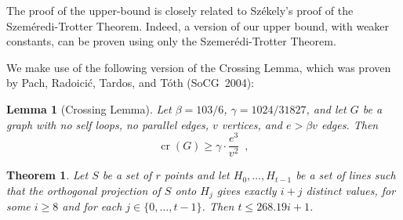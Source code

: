 \documentclass[12pt]{article}
\newtheorem{thm}{Theorem}
\newtheorem{lem}{Lemma}
\DeclareMathOperator{\cn}{cr}
\newcommand{\const}{268.19}
\begin{document}
The proof of the upper-bound is closely related to Sz\'ekely's proof of
the Szem\'eredi-Trotter Theorem.  Indeed, a version of our upper bound,
with weaker constants, can be proven using only the Szemer\'edi-Trotter
Theorem.

We make use of the following version of the Crossing Lemma, which was
proven by Pach, Radoici\'c, Tardos, and T\'oth (SoCG~2004):

\begin{lem}[Crossing Lemma]\label{lem:crossing}
Let
$\beta=103/6$, $\gamma = 1024/31827$, and let
$G$ be a graph with no self loops, no parallel edges, $v$ vertices, and
$e > \beta v$ edges.  Then
\[
  \cn(G) \ge \gamma \cdot \frac{e^3}{v^2} \enspace ,
\]
\end{lem}


\begin{thm}
Let $S$ be a set of $r$ points and let $H_0,\ldots,H_{t-1}$ be a
set of lines such that the orthogonal projection of $S$ onto $H_{j}$
gives exactly $i+j$ distinct values, for some $i\ge 8$ and for each
$j\in\{0,\ldots,t-1\}$.  Then $t \le \const i+1$.
\end{thm}
\end{document}
